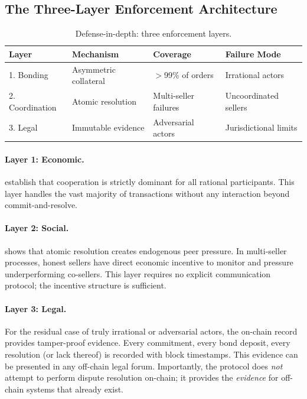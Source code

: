 \documentclass[11pt,a4paper]{article}
\theoremstyle{definition}
\theoremstyle{remark}
\begin{document}
\subsection{The Three-Layer Enforcement Architecture}

\begin{table}[ht]
\centering
\caption{Defense-in-depth: three enforcement layers.}
\label{tab:enforcement}
\begin{tabular}{llll}
\toprule
\textbf{Layer} & \textbf{Mechanism} & \textbf{Coverage} & \textbf{Failure Mode} \\
\midrule
1. Bonding  & Asymmetric collateral & $>$99\% of orders & Irrational actors \\
2. Coordination & Atomic resolution & Multi-seller failures & Uncoordinated sellers \\
3. Legal & Immutable evidence & Adversarial actors & Jurisdictional limits \\
\bottomrule
\end{tabular}
\end{table}

\paragraph{Layer 1: Economic.}
 establish that cooperation is
strictly dominant for all rational participants. This layer handles the
vast majority of transactions without any interaction beyond
commit-and-resolve.

\paragraph{Layer 2: Social.}
 shows that atomic resolution creates
endogenous peer pressure. In multi-seller processes, honest sellers have
direct economic incentive to monitor and pressure underperforming
co-sellers. This layer requires no explicit communication protocol; the
incentive structure is sufficient.

\paragraph{Layer 3: Legal.}
For the residual case of truly irrational or adversarial actors, the
on-chain record provides tamper-proof evidence. Every commitment, every
bond deposit, every resolution (or lack thereof) is recorded with
block timestamps. This evidence can be presented in any off-chain legal
forum. Importantly, the protocol does \emph{not} attempt to perform
dispute resolution on-chain; it provides the \emph{evidence} for
off-chain systems that already exist.
\end{document}
